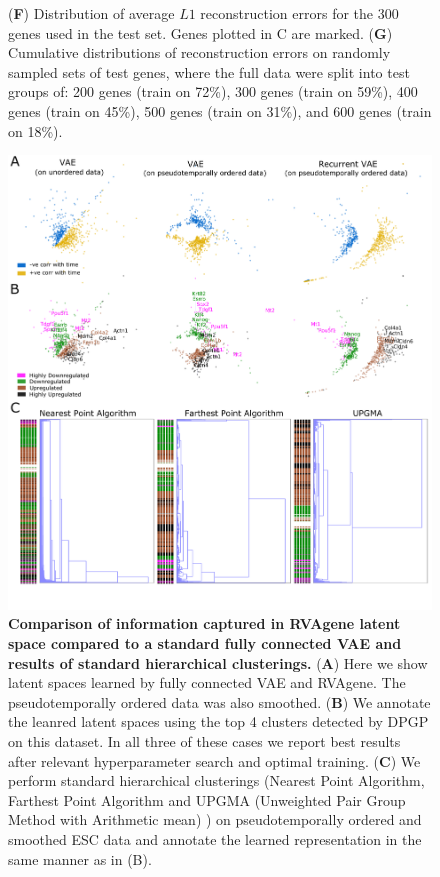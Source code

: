 {\begin{figure}
{    ({\bf F}) Distribution of average $L1$ reconstruction errors for the 300 genes used in the test set. Genes plotted in C are marked.
    ({\bf G}) Cumulative distributions of reconstruction errors on randomly sampled sets of test genes, where the full data were split into test groups of: 200 genes (train on 72\%), 300 genes (train on 59\%), 400 genes (train on 45\%), 500 genes (train on 31\%), and 600 genes (train on 18\%).}
    \label{fig:fig3}
\end{figure}
}

{\centering
\begin{figure}
  \includegraphics[width=\linewidth]{figures/vae_comp.png}
    \caption[Comparison of information captured in RVAgene latent space compared to a standard fully connected VAE and results of standard hierarchical clusterings.]{\textbf{Comparison of information captured in RVAgene latent space compared to a standard fully connected VAE and results of standard hierarchical clusterings.}
    ({\bf A}) Here we show latent spaces learned by fully connected VAE and RVAgene. The pseudotemporally ordered data was also smoothed. ({\bf B}) We annotate the leanred latent spaces using the top 4 clusters detected by DPGP on this dataset. In all three of these cases we report best results after relevant hyperparameter search and optimal training. ({\bf C}) We perform standard hierarchical clusterings (Nearest Point Algorithm, Farthest Point Algorithm and UPGMA (Unweighted Pair Group Method with Arithmetic mean) ) on pseudotemporally ordered and smoothed ESC data and annotate the learned representation in the same manner as in (B).} 
  \label{fig:fig4}
\end{figure}}

